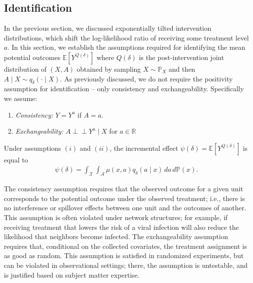 \documentclass[11pt,twoside]{article}
\newcommand{\ind}{\perp\!\!\!\!\perp}
\def\ind{\perp\!\!\!\perp}
\theoremstyle{definition}
\theoremstyle{remark}
\begin{document}
\subsection{Identification} \label{identification_section}


In the previous section, we discussed exponentially tilted intervention distributions, which shift the log-likelihood ratio of receiving some treatment level $a$. In this section, we establish the assumptions required for identifying the mean potential outcomes $\mathbb{E}[Y^{Q(\delta)}]$ where $Q(\delta)$ is the post-intervention joint distribution of $(X, A)$ obtained by sampling $X \sim \mathbb{P}_X$ and then $A \mid X \sim q_\delta( \cdot \mid X)$. As previously discussed, we do not require the positivity assumption for identification -- only consistency and exchangeability. Specifically we assume:
\begin{enumerate}
    \item[(i)] \textit{Consistency:} $Y = Y^a$ if $A = a$.
    \item[(ii)] \textit{Exchangeability:} $A \ind Y^a \mid X$ for $a \in \mathbb{R}$
\end{enumerate}
Under assumptions $(i)$ and $(ii)$, the incremental effect $\psi(\delta) = \mathbb{E}[Y^{Q(\delta)}]$ is equal to
\begin{align} \label{identified_eq}
    \psi(\delta) =  \int_\mathcal{X} \int_\mathcal{A} \mu(x, a) q_\delta(a \mid x) \, da \, d\mathbb{P}(x).
\end{align}

The consistency assumption requires that the observed outcome for a given unit corresponds to the potential outcome under the observed treatment; i.e., there is no interference or spillover effects between one unit and the outcomes of another. This assumption is often violated under network structures; for example, if receiving treatment that lowers the risk of a viral infection will also reduce the likelihood that neighbors become infected. The exchangeability assumption requires that, conditional on the collected covariates, the treatment assignment is as good as random. This assumption is satisfied in randomized experiments, but can be violated in observational settings; there, the assumption is untestable, and is justified based on subject matter expertise.
\end{document}
